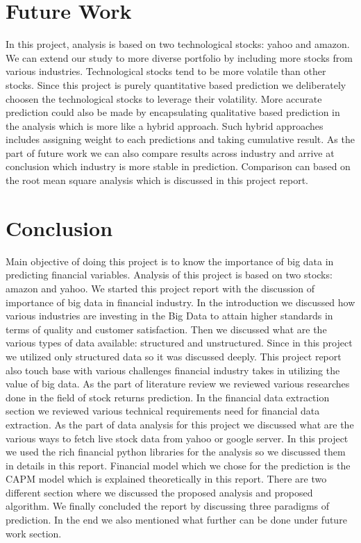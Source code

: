 \section{Future Work}
In this project, analysis is based on two technological stocks: yahoo and amazon. We can extend our study to more diverse portfolio by including more stocks 
from various industries. Technological stocks tend to be more volatile than other stocks. Since this project is purely quantitative based prediction we 
deliberately choosen the technological stocks to leverage their volatility. More accurate prediction could also be made by encapsulating qualitative based prediction
 in the analysis which is more like a hybrid approach. Such hybrid approaches includes assigning weight to each predictions and taking cumulative result.  
 As the part of future work we can also compare results across industry and arrive at conclusion which industry is more stable in prediction. Comparison can based on 
the root mean square analysis which is discussed in this project report.  


\section{Conclusion}

Main objective of doing this project is to know the importance of big data in predicting financial variables. Analysis of this project is based on two stocks:
amazon and yahoo. We started this project report with the discussion of importance of big data in financial industry. In the introduction we discussed how various
industries are investing in the Big Data to attain higher standards in terms of quality and customer satisfaction. Then we discussed what are the various types 
of data available: structured and unstructured. Since in this project we utilized only structured data so it was discussed deeply. This project report also touch base
with various challenges financial industry takes in utilizing the value of big data. As the part of literature review we reviewed various researches done in the field of 
stock returns prediction. In the financial data extraction section we reviewed various technical requirements need for financial data extraction. As the part 
of data analysis for this project we discussed what are the various ways to fetch live stock data from yahoo or google server. In this project  we used the 
rich financial python libraries for the analysis so we discussed them in details in this report.  Financial model which we chose for the prediction is the CAPM model which 
is explained theoretically in this report.  There are two different section where we discussed the proposed analysis and proposed algorithm. We finally concluded the 
report by discussing three paradigms of prediction. In the end we also mentioned what further can be done under future work section. 
 

